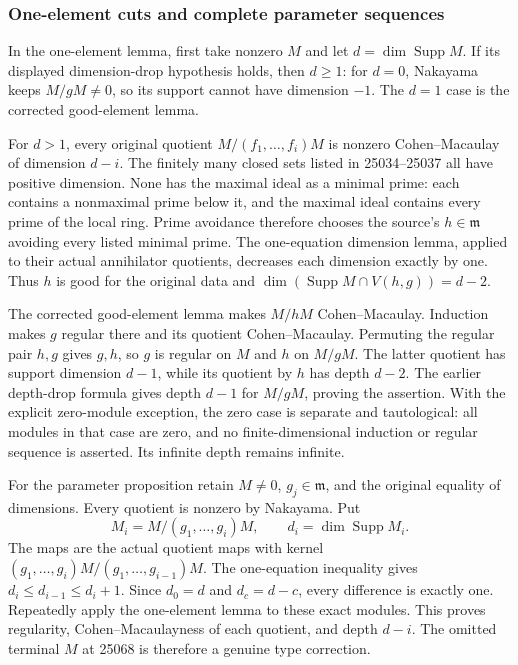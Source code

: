 \subsubsection{One-element cuts and complete parameter sequences}\label{algebra-proof-019-one-element-cuts-and-complete-parameter-sequences}

In the one-element lemma, first take nonzero \(M\) and let \(d=\dim\operatorname{Supp}M\). If its displayed dimension-drop hypothesis holds, then \(d\ge1\): for \(d=0\), Nakayama keeps \(M/gM\ne0\), so its support cannot have dimension \(-1\). The \(d=1\) case is the corrected good-element lemma.

For \(d>1\), every original quotient \(M/(f_1,\ldots,f_i)M\) is nonzero Cohen--Macaulay of dimension \(d-i\). The finitely many closed sets listed in 25034--25037 all have positive dimension. None has the maximal ideal as a minimal prime: each contains a nonmaximal prime below it, and the maximal ideal contains every prime of the local ring. Prime avoidance therefore chooses the source's \(h\in\mathfrak m\) avoiding every listed minimal prime. The one-equation dimension lemma, applied to their actual annihilator quotients, decreases each dimension exactly by one. Thus \(h\) is good for the original data and \(\dim(\operatorname{Supp}M\cap V(h,g))=d-2\).

The corrected good-element lemma makes \(M/hM\) Cohen--Macaulay. Induction makes \(g\) regular there and its quotient Cohen--Macaulay. Permuting the regular pair \(h,g\) gives \(g,h\), so \(g\) is regular on \(M\) and \(h\) on \(M/gM\). The latter quotient has support dimension \(d-1\), while its quotient by \(h\) has depth \(d-2\). The earlier depth-drop formula gives depth \(d-1\) for \(M/gM\), proving the assertion. With the explicit zero-module exception, the zero case is separate and tautological: all modules in that case are zero, and no finite-dimensional induction or regular sequence is asserted. Its infinite depth remains infinite.

For the parameter proposition retain \(M\ne0\), \(g_j\in\mathfrak m\), and the original equality of dimensions. Every quotient is nonzero by Nakayama. Put \[
 M_i=M/(g_1,\ldots,g_i)M,\qquad d_i=\dim\operatorname{Supp}M_i.
\] The maps are the actual quotient maps with kernel \((g_1,\ldots,g_i)M/(g_1,\ldots,g_{i-1})M\). The one-equation inequality gives \(d_i\le d_{i-1}\le d_i+1\). Since \(d_0=d\) and \(d_c=d-c\), every difference is exactly one. Repeatedly apply the one-element lemma to these exact modules. This proves regularity, Cohen--Macaulayness of each quotient, and depth \(d-i\). The omitted terminal \(M\) at 25068 is therefore a genuine type correction.

